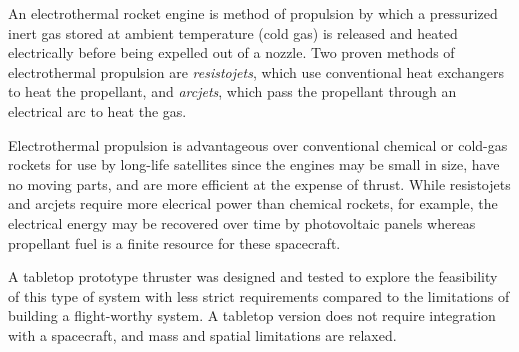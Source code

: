 \documentclass[journal]{IEEEtran}
\begin{document}
An electrothermal rocket engine is method of propulsion by which a pressurized inert gas stored at ambient temperature (cold gas) is released and heated electrically before being expelled out of a nozzle.
Two proven methods of electrothermal propulsion are \emph{resistojets}, which use conventional heat exchangers to heat the propellant, and \emph{arcjets}, which pass the propellant through an electrical arc to heat the gas.

Electrothermal propulsion is advantageous over conventional chemical or cold-gas rockets for use by long-life satellites since the engines may be small in size, have no moving parts, and are more efficient at the expense of thrust.
While resistojets and arcjets require more elecrical power than chemical rockets, for example, the electrical energy may be recovered over time by photovoltaic panels whereas propellant fuel is a finite resource for these spacecraft.

A tabletop prototype thruster was designed and tested to explore the feasibility of this type of system with less strict requirements compared to the limitations of building a flight-worthy system.
A tabletop version does not require integration with a spacecraft, and mass and spatial limitations are relaxed.
\end{document}
